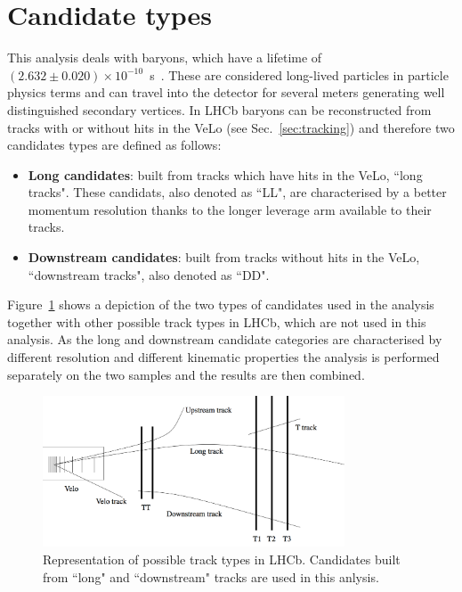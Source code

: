 \section{Candidate types}

This analysis deals with \Lz baryons, which have a lifetime of \mbox{$(2.632 \pm 0.020 ) \times 10^{-10}$ s~\cite{PDG2014}}.
These are considered long-lived particles in particle physics terms and can travel into the
detector for several meters generating well distinguished secondary vertices.
In LHCb \Lz baryons can be reconstructed from tracks with or without hits in the VeLo (see Sec.~\ref{sec:tracking}) and
therefore two candidates types are defined as follows:

\begin{itemize}
\item {\bf Long candidates}: built from tracks which have hits in the VeLo, ``long tracks".
These candidats, also denoted as ``LL", are characterised by a better momentum resolution
thanks to the longer leverage arm available to their tracks.
\item {\bf Downstream candidates}: built from tracks without hits in the VeLo, 
``downstream tracks", also denoted as ``DD".
\end{itemize}

Figure~\ref{fig:track_types} shows a depiction of the two types of candidates used in the analysis
together with other possible track types in LHCb, which are not used in this analysis.
As the long and downstream candidate categories are characterised by different resolution and different
kinematic properties the analysis is performed separately on the two samples and the results are then combined.

\begin{figure}[hbt]
\centering
\includegraphics[width=0.8\textwidth,trim=0cm 0cm 0cm 5mm,]{Lmumu/figs/track_types.png}
\caption{Representation of possible track types in LHCb. Candidates built from ``long" and 
``downstream" tracks are used in this anlysis.}
\label{fig:track_types}
\end{figure}
 
